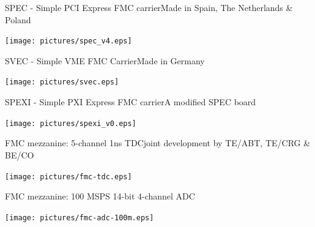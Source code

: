 \documentclass[compress,red]{beamer}
\begin{document}
\begin{frame}{SPEC - Simple PCI Express FMC carrier}{Made in Spain, The Netherlands \& Poland}

  \begin{center}
    \texttt{[image: pictures/spec\_v4.eps]}
  \end{center}

\end{frame}

\begin{frame}{SVEC - Simple VME FMC Carrier}{Made in Germany}

  \begin{center}
    \texttt{[image: pictures/svec.eps]}
  \end{center}

\end{frame}

\begin{frame}{SPEXI - Simple PXI Express FMC carrier}{A modified SPEC board}

  \begin{center}
    \texttt{[image: pictures/spexi\_v0.eps]}
  \end{center}

\end{frame}

\begin{frame}{FMC mezzanine: 5-channel 1ns TDC}{joint development by TE/ABT, TE/CRG \& BE/CO}

  \begin{center}
    \texttt{[image: pictures/fmc-tdc.eps]}
  \end{center}

\end{frame}

\begin{frame}{FMC mezzanine: 100 MSPS 14-bit 4-channel ADC}

  \begin{center}
    \texttt{[image: pictures/fmc-adc-100m.eps]}
  \end{center}

\end{frame}

\end{document}
